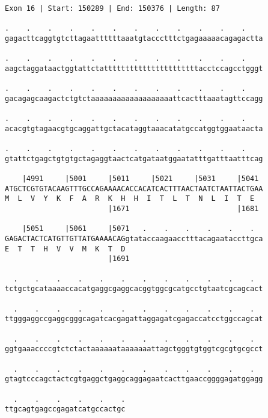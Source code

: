\documentclass{article}
\begin{document}
\begin{Verbatim}[fontfamily=courier]
Exon 16 | Start: 150289 | End: 150376 | Length: 87

.    .    .    .    .    .    .    .    .    .    .    .    
gagacttcaggtgtcttagaattttttaaatgtaccctttctgagaaaaacagagactta

.    .    .    .    .    .    .    .    .    .    .    .    
aagctaggataactggtattctattttttttttttttttttttttacctccagcctgggt

.    .    .    .    .    .    .    .    .    .    .    .    
gacagagcaagactctgtctaaaaaaaaaaaaaaaaaaattcactttaaatagttccagg

.    .    .    .    .    .    .    .    .    .    .    .    
acacgtgtagaacgtgcaggattgctacataggtaaacatatgccatggtggaataacta

.    .    .    .    .    .    .    .    .    .    .    .    
gtattctgagctgtgtgctagaggtaactcatgataatggaatatttgatttaatttcag

    |4991     |5001     |5011     |5021     |5031     |5041 
ATGCTCGTGTACAAGTTTGCCAGAAAACACCACATCACTTTAACTAATCTAATTACTGAA
M  L  V  Y  K  F  A  R  K  H  H  I  T  L  T  N  L  I  T  E  
                        |1671                         |1681 

    |5051     |5061     |5071   .    .    .    .    .    .  
GAGACTACTCATGTTGTTATGAAAACAGgtataccaagaacctttacagaataccttgca
E  T  T  H  V  V  M  K  T  D                                
                        |1691                               

  .    .    .    .    .    .    .    .    .    .    .    .  
tctgctgcataaaaccacatgaggcgaggcacggtggcgcatgcctgtaatcgcagcact

  .    .    .    .    .    .    .    .    .    .    .    .  
ttgggaggccgaggcgggcagatcacgagattaggagatcgagaccatcctggccagcat

  .    .    .    .    .    .    .    .    .    .    .    .  
ggtgaaaccccgtctctactaaaaaataaaaaaattagctgggtgtggtcgcgtgcgcct

  .    .    .    .    .    .    .    .    .    .    .    .  
gtagtcccagctactcgtgaggctgaggcaggagaatcacttgaaccggggagatggagg

  .    .    .    .    .    .
ttgcagtgagccgagatcatgccactgc
\end{Verbatim}
\newpage
\end{document}
